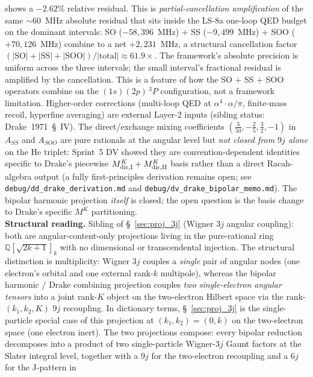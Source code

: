 shows a $-2.62\%$ relative residual.  This is \emph{partial-cancellation
amplification} of the same $\sim$$60$~MHz absolute residual that sits
inside the LS-8a one-loop QED budget on the dominant intervals: SO
($-58{,}396$~MHz) $+$ SS ($-9{,}499$~MHz) $+$ SOO ($+70{,}126$~MHz)
combine to a net $+2{,}231$~MHz, a structural cancellation factor
$(|\text{SO}|+|\text{SS}|+|\text{SOO}|) / |\text{total}| \approx 61.9\times$.
The framework's absolute precision is uniform across the three
intervals; the small interval's fractional residual is amplified by
the cancellation.  This is a feature of how the SO + SS + SOO
operators combine on the $(1s)(2p)\,{}^3\!P$ configuration, not a
framework limitation.  Higher-order corrections (multi-loop QED at
$\alpha^4 \cdot \alpha/\pi$, finite-mass recoil, hyperfine averaging)
are external Layer-2 inputs (sibling status: Drake~1971~\S~IV).
The direct/exchange mixing coefficients
$(\tfrac{3}{50}, -\tfrac{2}{5}, \tfrac{3}{2}, -1)$ in
$A_{SS}$ and $A_{SOO}$ are pure rationals at the angular level but
\emph{not closed from $9j$ alone} on the He triplet: Sprint~5 DV
showed they are convention-dependent identities specific to Drake's
piecewise $M^K_{\rm dir,I} + M^K_{\rm dir,II}$ basis rather than a
direct Racah-algebra output (a fully first-principles derivation
remains open; see \texttt{debug/dd\_drake\_derivation.md} and
\texttt{debug/dv\_drake\_bipolar\_memo.md}).  The bipolar harmonic
projection \emph{itself} is closed; the open question is the basis
change to Drake's specific $M^K$ partitioning.\\
\textbf{Structural reading.}  Sibling of \S~\ref{sec:proj_3j}
(Wigner $3j$ angular coupling): both are angular-content-only
projections living in the pure-rational ring
$\mathbb{Q}[\sqrt{2k+1}]_{k}$ with no dimensional or transcendental
injection.  The structural distinction is multiplicity: Wigner $3j$
couples a \emph{single} pair of angular nodes (one electron's
orbital and one external rank-$k$ multipole), whereas the bipolar
harmonic / Drake combining projection couples \emph{two
single-electron angular tensors} into a joint rank-$K$ object on
the two-electron Hilbert space via the rank-$(k_1, k_2, K)$
$9j$ recoupling.  In dictionary terms, \S~\ref{sec:proj_3j} is
the single-particle special case of this projection at
$(k_1, k_2) = (0, k)$ on the two-electron space (one electron
inert).  The two projections compose: every bipolar reduction
decomposes into a product of two single-particle Wigner-$3j$ Gaunt
factors at the Slater integral level, together with a $9j$ for the
two-electron recoupling and a $6j$ for the J-pattern in
$$

